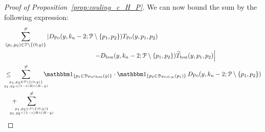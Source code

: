 \begin{proof}[Proof of Proposition~\ref{prop:couling_c_H_P}]
We can now bound the sum by the following expression:
\begin{align} 
	&\sum_{(p_1,p_2) \in \Pcal \setminus \{(0,y)\}}^{\not =} 
	  \left| D_{\Po}(y,k_n-2; \Pcal \setminus \{p_1,p_2 \}) T_{\Po} (y,p_1,p_2) \right. \notag \\
	& \hspace{5cm} \left. - D_{\text{box}} (y,k_n-2;\Pcal \setminus \{p_1,p_2\}) \widetilde{T}_{\text{box}} (y,p_1,p_2)
	   \right|  \notag \\
	&\le \hspace{-15pt} \sum_{p_1,p_2\in \Pcal \setminus \{(0,y)\} \atop  y_1, y_2 < (1-\eps)R \wedge (R-y)}^{\ne}
		\hspace{-10pt} \ind{p_1 \in \BallInter{y}} \cdot \ind{p_2 \in \BallSym{p_1}} 
		\, D_{\Po} (y,k_n-2;\Pcal \setminus \{ p_1,p_2\}) \label{eq:sum_1}\\
	&\hspace{10pt}+ \hspace{-15pt} \sum_{p_1,p_2\in \Pcal \setminus \{(0,y)\} \atop  y_1, y_2 < (1-\eps)R \wedge (R-y)}^{\ne} 

\end{align}
\end{proof}
